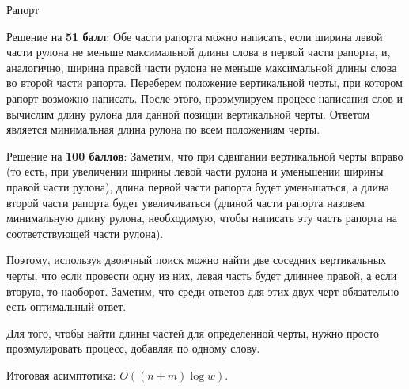 \begin{tutorial}{Рапорт}

Решение на \textbf{51 балл}: Обе части рапорта можно написать, если ширина левой части рулона не меньше максимальной длины слова в первой части рапорта, 
и, аналогично, ширина правой части рулона не меньше максимальной длины слова во второй части рапорта. Переберем положение вертикальной черты, при котором рапорт возможно написать. После этого, проэмулируем процесс написания слов и вычислим длину рулона для данной позиции вертикальной черты. Ответом является минимальная длина рулона по всем положениям черты.

Решение на \textbf{100 баллов}:
Заметим, что при сдвигании вертикальной черты вправо (то есть, при увеличении ширины левой части рулона и уменьшении ширины правой части рулона),
длина первой части рапорта будет уменьшаться, а длина второй части рапорта будет увеличиваться (длиной части рапорта назовем минимальную длину рулона, 
необходимую, чтобы написать эту часть рапорта на соответствующей части рулона).

Поэтому, используя двоичный поиск можно найти две соседних вертикальных черты, что если провести одну из них, левая часть будет длиннее правой, 
а если вторую, то наоборот.
Заметим, что среди ответов для этих двух черт обязательно есть оптимальный ответ.

Для того, чтобы найти длины частей для определенной черты, нужно просто проэмулировать процесс, добавляя по одному слову.

Итоговая асимптотика: $O((n + m) \log w)$.

\end{tutorial}

